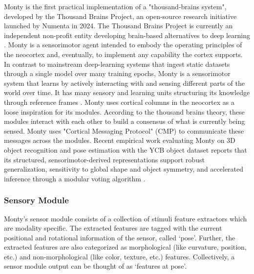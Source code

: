 \documentclass[runningheads]{llncs}
\begin{document}
Monty is the first practical implementation of a "thousand-brains system", developed by the Thousand Brains Project, an open-source research initiative launched by Numenta in 2024. The Thousand Brains Project is currently an independent non-profit entity developing brain-based alternatives to deep learning \cite{thousandbrainsproject2024}. Monty is a sensorimotor agent intended to embody the operating principles of the neocortex and, eventually, to implement any capability the cortex supports. In contrast to mainstream deep-learning systems that ingest static datasets through a single model over many training epochs, Monty is a sensorimotor system that learns by actively interacting with and sensing different parts of the world over time. It has many sensory and learning units structuring its knowledge through reference frames \cite{thousandbrainsproject2024}. Monty uses cortical columns in the neocortex \cite{mountcastle_columnar_1997} as a loose inspiration for its modules. According to the thousand brains theory, these modules interact with each other to build a consensus of what is currently being sensed. Monty uses "Cortical Messaging Protocol" (CMP) to communicate these messages across the modules. Recent empirical work evaluating Monty on 3D object recognition and pose estimation with the YCB object dataset reports that its structured, sensorimotor-derived representations support robust generalization, sensitivity to global shape and object symmetry, and accelerated inference through a modular voting algorithm \cite{leadholm2021grid,leadholm2026thousand}. 
 
\subsubsection{Sensory Module}
Monty’s sensor module \cite{2026ThousandbrainsprojectTbpmonty} consists of a collection of stimuli feature extractors which are modality specific. The extracted features are tagged with the current positional and rotational information of the sensor, called ‘pose’. Further, the extracted features are also categorized as morphological (like curvature, position, etc.) and non-morphological (like color, texture, etc.) features. Collectively, a sensor module output can be thought of as `features at pose'. 
\end{document}
